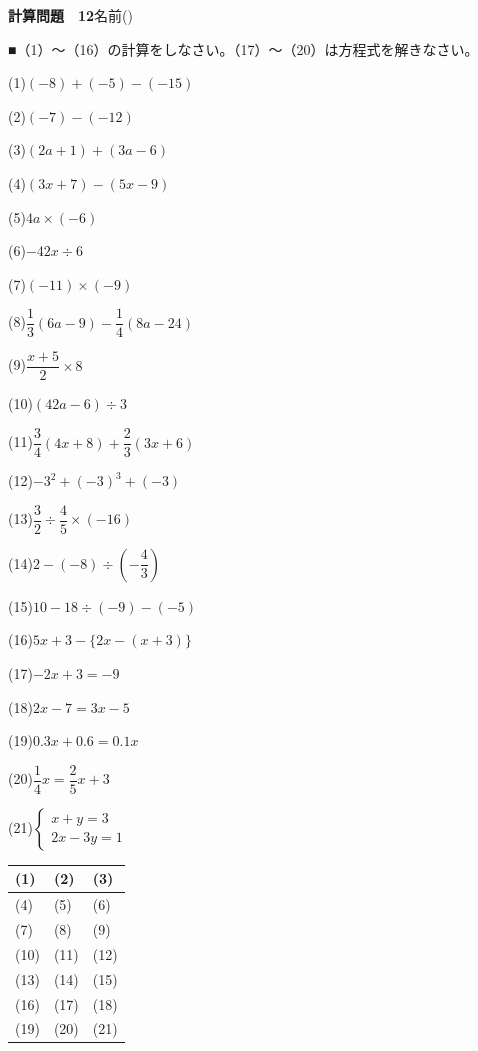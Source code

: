 \documentclass[a4paper,11pt]{ltjsarticle}
\newlength{\qcol}\setlength{\qcol}{0.47\textwidth}
\newlength{\qgap}
\newlength{\anscolw}\setlength{\anscolw}{0.30\textwidth}
\newlength{\ansh}
\newcommand{\Q}[2]{\parbox[t]{\qcol}{\raggedright (#1)\hspace{0.6em}$\displaystyle #2$}}
\newcommand{\QR}[4]{\Q{#1}{#2}\hfill\Q{#3}{#4}\par\vspace{\qgap}}
\newcommand{\anscell}[1]{\rule[-\ansdrop]{0pt}{\ansh}(#1)}
\newlength{\ansdrop}
\begin{document}
{\large\bfseries 計算問題　12}\hfill 名前(\underline{\hspace{32mm}})\par\vspace{3mm}
■（1）〜（16）の計算をしなさい。（17）〜（20）は方程式を解きなさい。\par\vspace{3mm}
\setlength{\qgap}{5.4mm}
\QR{1}{(-8)+(-5)-(-15)}{2}{(-7)-(-12)}
\QR{3}{(2a+1)+(3a-6)}{4}{(3x+7)-(5x-9)}
\QR{5}{4a\times(-6)}{6}{-42x\div6}
\QR{7}{(-11)\times(-9)}{8}{\dfrac{1}{3}(6a-9)-\dfrac{1}{4}(8a-24)}
\QR{9}{\dfrac{x+5}{2}\times8}{10}{(42a-6)\div3}
\QR{11}{\dfrac{3}{4}(4x+8)+\dfrac{2}{3}(3x+6)}{12}{-3^2+(-3)^3+(-3)}
\QR{13}{\dfrac{3}{2}\div\dfrac{4}{5}\times(-16)}{14}{2-(-8)\div\left(-\dfrac{4}{3}\right)}
\QR{15}{10-18\div(-9)-(-5)}{16}{5x+3-\{2x-(x+3)\}}
\QR{17}{-2x+3=-9}{18}{2x-7=3x-5}
\QR{19}{0.3x+0.6=0.1x}{20}{\dfrac{1}{4}x=\dfrac{2}{5}x+3}
\vspace{1mm}
\Q{21}{\left\{\begin{array}{l} x+y=3 \\ 2x-3y=1 \end{array}\right.}\par\vspace{3mm}
\setlength{\ansh}{9.5mm}\setlength{\ansdrop}{6mm}%
\begin{center}\begin{tabular}{|p{\anscolw}|p{\anscolw}|p{\anscolw}|}\hline
\anscell{1} & \anscell{2} & \anscell{3} \\\hline
\anscell{4} & \anscell{5} & \anscell{6} \\\hline
\anscell{7} & \anscell{8} & \anscell{9} \\\hline
\anscell{10} & \anscell{11} & \anscell{12} \\\hline
\anscell{13} & \anscell{14} & \anscell{15} \\\hline
\anscell{16} & \anscell{17} & \anscell{18} \\\hline
\anscell{19} & \anscell{20} & \anscell{21} \\\hline
\end{tabular}\end{center}
\end{document}
